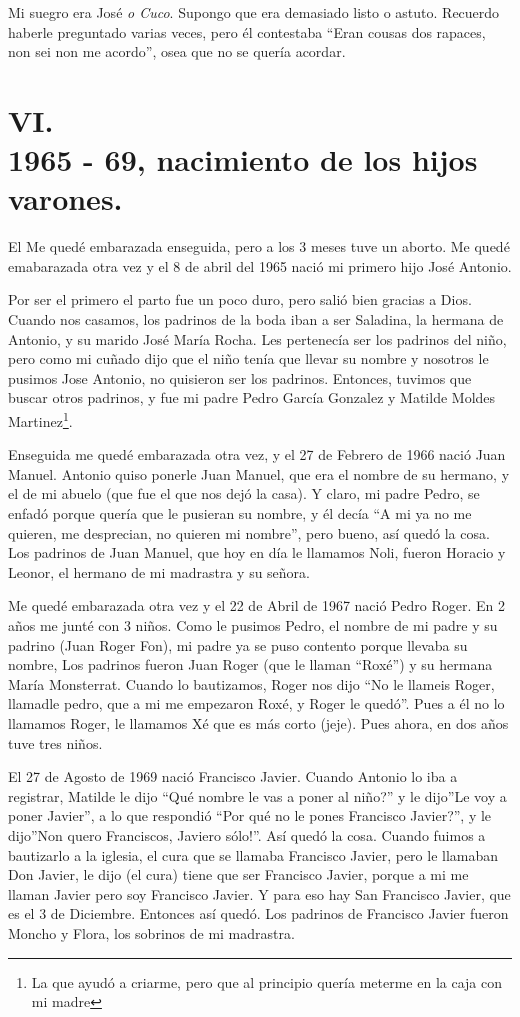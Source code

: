 \documentclass[12pt,a5paper]{book}
\begin{document}
Mi suegro era José \textit{o Cuco}. Supongo que era demasiado listo o astuto. Recuerdo haberle preguntado varias veces, pero él contestaba ``Eran cousas dos rapaces, non sei non me acordo'', osea que no se quería acordar.


\section*{VI.\\1965 - 69, nacimiento de los hijos varones.}


El Me quedé embarazada enseguida, pero a los 3 meses tuve un aborto. Me quedé emabarazada otra vez y el 8 de abril del 1965 nació mi primero hijo José Antonio.

Por ser el primero el parto fue un poco duro, pero salió bien gracias a Dios. Cuando nos casamos, los padrinos de la boda iban a ser Saladina, la hermana de Antonio, y su marido José María Rocha. Les pertenecía ser los padrinos del niño, pero como mi cuñado dijo que el niño tenía que llevar su nombre y nosotros le pusimos Jose Antonio, no quisieron ser los padrinos. Entonces, tuvimos que buscar otros padrinos, y fue mi padre Pedro García Gonzalez y Matilde Moldes Martinez\footnote{La que ayudó a criarme, pero que al principio quería meterme en la caja con mi madre}. 

Enseguida me quedé embarazada otra vez, y el 27 de Febrero de 1966 nació Juan Manuel. Antonio quiso ponerle Juan Manuel, que era el nombre de su hermano, y el de mi abuelo (que fue el que nos dejó la casa). Y claro, mi padre Pedro, se enfadó porque quería que le pusieran su nombre, y él decía “A mi ya no me quieren, me desprecian, no quieren mi nombre”, pero bueno, así quedó la cosa. Los padrinos de Juan Manuel, que hoy en día le llamamos Noli, fueron Horacio y Leonor, el hermano de mi madrastra y su señora.

Me quedé embarazada otra vez y el 22 de Abril de 1967 nació Pedro Roger. En 2 años me junté con 3 niños. Como le pusimos Pedro, el nombre de mi padre y su padrino (Juan Roger Fon), mi padre ya se puso contento porque llevaba su nombre, Los padrinos fueron Juan Roger (que le llaman “Roxé”) y su hermana María Monsterrat. Cuando lo bautizamos, Roger nos dijo “No le llameis Roger, llamadle pedro, que a mi me empezaron Roxé, y Roger le quedó”. Pues a él no lo llamamos Roger, le llamamos Xé que es más corto (jeje).  Pues ahora, en dos años tuve tres niños.

 El 27 de Agosto de 1969 nació Francisco Javier.  Cuando Antonio lo iba a registrar, Matilde le dijo “Qué nombre le vas a poner al niño?” y le dijo”Le voy a poner Javier”, a lo que respondió “Por qué no le pones Francisco Javier?”, y le dijo”Non quero Franciscos, Javiero sólo!”. Así quedó la cosa. Cuando fuimos a bautizarlo a la iglesia, el cura que se llamaba Francisco Javier, pero le llamaban Don Javier, le dijo (el cura) tiene que ser Francisco Javier, porque a mi me llaman Javier pero soy Francisco Javier. Y para eso hay San Francisco Javier, que es el 3 de Diciembre. Entonces así quedó. Los padrinos de Francisco Javier fueron Moncho y Flora, los sobrinos de mi madrastra.
\end{document}
